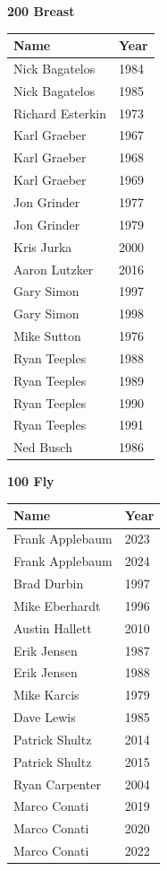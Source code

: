 \vspace{1.2em}
\noindent\begin{minipage}[t]{0.48\textwidth}
\centering
\textbf{\textcolor{teamprimary}{200 Breast}}\par
\vspace{0.5em}
\centering
\small
\renewcommand{\arraystretch}{1.0}
\setlength{\tabcolsep}{4pt}
\begin{tabular}{@{}p{3.0cm}p{1.0cm}@{}}
\toprule
\textbf{Name} & \textbf{Year} \\
\midrule
Nick Bagatelos & 1984 \\
Nick Bagatelos & 1985 \\
Richard Esterkin & 1973 \\
Karl Graeber & 1967 \\
Karl Graeber & 1968 \\
Karl Graeber & 1969 \\
Jon Grinder & 1977 \\
Jon Grinder & 1979 \\
Kris Jurka & 2000 \\
Aaron Lutzker & 2016 \\
Gary Simon & 1997 \\
Gary Simon & 1998 \\
Mike Sutton & 1976 \\
Ryan Teeples & 1988 \\
Ryan Teeples & 1989 \\
Ryan Teeples & 1990 \\
Ryan Teeples & 1991 \\
Ned Busch & 1986 \\
\bottomrule
\end{tabular}
\end{minipage}
\hfill
\begin{minipage}[t]{0.48\textwidth}
\centering
\textbf{\textcolor{teamprimary}{100 Fly}}\par
\vspace{0.5em}
\centering
\small
\renewcommand{\arraystretch}{1.0}
\setlength{\tabcolsep}{4pt}
\begin{tabular}{@{}p{3.0cm}p{1.0cm}@{}}
\toprule
\textbf{Name} & \textbf{Year} \\
\midrule
Frank Applebaum & 2023 \\
Frank Applebaum & 2024 \\
Brad Durbin & 1997 \\
Mike Eberhardt & 1996 \\
Austin Hallett & 2010 \\
Erik Jensen & 1987 \\
Erik Jensen & 1988 \\
Mike Karcis & 1979 \\
Dave Lewis & 1985 \\
Patrick Shultz & 2014 \\
Patrick Shultz & 2015 \\
Ryan Carpenter & 2004 \\
Marco Conati & 2019 \\
Marco Conati & 2020 \\
Marco Conati & 2022 \\
\bottomrule
\end{tabular}
\end{minipage}

